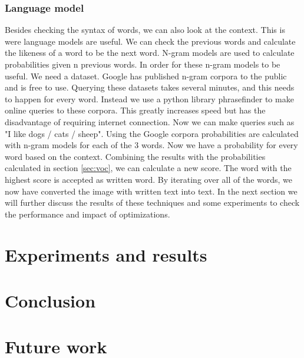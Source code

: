 \documentclass{article}
\begin{document}
\subsubsection{Language model}
\label{sec:lm}
Besides checking the syntax of words, we can also look at the context. This is were language models are useful. We can check the previous words and calculate the likeness of a word to be the next word. N-gram models are used to calculate probabilities given n previous words. 
In order for these n-gram models to be useful. We need a dataset. Google has published n-gram corpora to the public and is free to use. Querying these datasets takes several minutes, and this needs to happen for every word. Instead we use a python library phrasefinder to make online queries to these corpora. This greatly increases speed but has the disadvantage of requiring internet connection. 
Now we can make queries such as "I like dogs / cats / sheep". Using the Google corpora probabilities are calculated with n-gram models for each of the 3 words. Now we have a probability for every word based on the context. 
Combining the results with the probabilities calculated in section \ref{sec:voc}, we can 
calculate a new score. The word with the highest score is accepted as written word. By iterating over all of the words, we now have converted the image with written text into text. In the next section we will
further discuss the results of these techniques and some experiments to check the performance and impact of optimizations. 
\section{Experiments and results}
\label{sec:expres}
\section{Conclusion}

\section{Future work}



\end{document}
